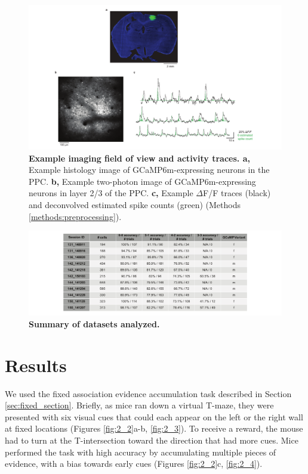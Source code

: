 \begin{figure}
\includegraphics[width=1.1\textwidth,center]{figures/fig_3_1.pdf}
\caption[Example imaging field of view and activity traces.]{\textbf{Example imaging field of view and activity traces. a,} Example histology image of GCaMP6m-expressing neurons in the PPC. 
%
\textbf{b,} Example two-photon image of GCaMP6m-expressing neurons in layer 2/3 of the PPC. 
%
\textbf{c,} Example $\Delta$F/F traces (black) and deconvolved estimated spike counts (green) (Methods \ref{methods:preprocessing}).
\label{fig:3_1}}
\end{figure}

\begin{figure}
\includegraphics[width=1.5\textwidth,center]{figures/fig_3_2.pdf}
\caption[Summary of datasets analyzed.]{\textbf{Summary of datasets analyzed.}
\label{fig:3_2}}
\end{figure}

\section{Results} \label{sec:chap3_results}

We used the fixed association evidence accumulation task described in Section \ref{sec:fixed_section}. Briefly, as mice ran down a virtual T-maze, they were presented with six visual cues that could each appear on the left or the right wall at fixed locations (Figures \ref{fig:2_2}a-b, \ref{fig:2_3}). To receive a reward, the mouse had to turn at the T-intersection toward the direction that had more cues. Mice performed the task with high accuracy by accumulating multiple pieces of evidence, with a bias towards early cues (Figures \ref{fig:2_2}c, \ref{fig:2_4}).

